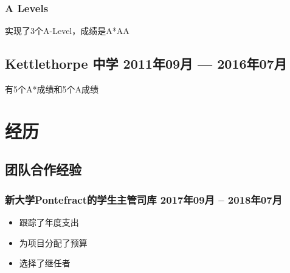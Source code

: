 \documentclass[10pt]{extarticle}
\begin{document}
            \subsubsection{A Levels}
            实现了3个A-Level，成绩是A*AA %
            \begin{comment}
                \begin{tabular}{cccc}
                    \textbf{Subject} & \textbf{Exam Board} & \textbf{AS/A2} &
                    \textbf{Grade}\\
                    Mathematics & AQA & A2 & A* \\
                    Further Mathematics & AQA & A2 & A \\
                    Computer Science & OCR & A2 & A \\
                    Physics & AQA & AS & A
                \end{tabular}
            \end{comment}
        \subsection{Kettlethorpe 中学 %
            \hfill 2011年09月 --- 2016年07月}
            有5个A*成绩和5个A成绩
\section{经历} %
    \subsection{团队合作经验}
        \subsubsection{新大学Pontefract的学生主管司库 %
        \hfill 2017年09月 -- 2018年07月}
            \begin{itemize}
                \item 跟踪了年度支出
                \item 为项目分配了预算
                \item 选择了继任者
            \end{itemize}
\end{document}
